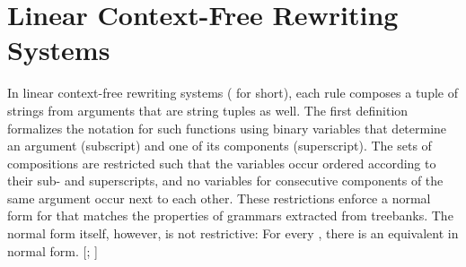 \documentclass[../../document.tex]{subfiles}
\begin{document}
    \section{Linear Context-Free Rewriting Systems}\label{sec:grammar:lcfrs}
    In linear context-free rewriting systems ( for short), each rule composes a tuple of strings from arguments that are string tuples as well.
    The first definition formalizes the notation for such functions using binary variables that determine an argument (subscript) and one of its components (superscript).
    The sets of compositions are restricted such that the variables occur ordered according to their sub- and superscripts, and no variables for consecutive components of the same argument occur next to each other.
    These restrictions enforce a normal form for  that matches the properties of grammars extracted from treebanks.
    The normal form itself, however, is not restrictive: For every , there is an equivalent  in normal form. [\citealp[Lemma~2.2]{SekMatFujKas91}; \citealp[Definition~7.2]{Kal10}]
\end{document}
